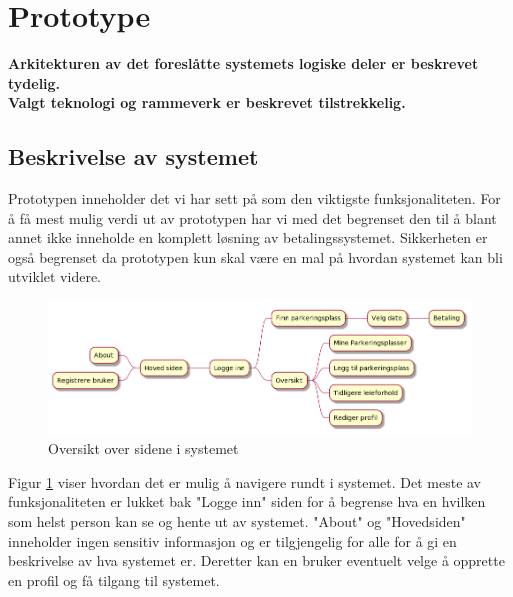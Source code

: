 \section{Prototype}
\textbf{Arkitekturen av det foreslåtte systemets logiske deler er beskrevet tydelig. \\
Valgt teknologi og rammeverk er beskrevet tilstrekkelig.}
\subsection{Beskrivelse av systemet}
Prototypen inneholder det vi har sett på som den viktigste funksjonaliteten. For å få mest mulig verdi ut av prototypen har vi med det begrenset den til å blant annet ikke inneholde en komplett løsning av betalingssystemet. Sikkerheten er også begrenset da prototypen kun skal være en mal på hvordan systemet kan bli utviklet videre.

\begin{figure}[H]
    \centering
    \includegraphics[width=12cm]{bilder/uml/oversikt.png}
    \caption{Oversikt over sidene i systemet}
    \label{fig:proto_overview}
\end{figure}
Figur \ref{fig:proto_overview} viser hvordan det er mulig å navigere rundt i systemet. Det meste av funksjonaliteten er lukket bak "Logge inn" siden for å begrense hva en hvilken som helst person kan se og hente ut av systemet. "About" og "Hovedsiden" inneholder ingen sensitiv informasjon og er tilgjengelig for alle for å gi en beskrivelse av hva systemet er. Deretter kan en bruker eventuelt velge å opprette en profil og få tilgang til systemet.

